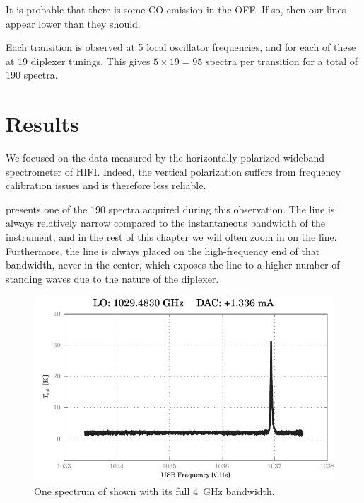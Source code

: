 It is probable that there is some CO emission in the OFF.  If so, then our lines appear lower than they should.

Each transition is observed at 5 local oscillator frequencies, and for each of these at 19 diplexer tunings.
This gives $5 \times 19 = 95$ spectra per transition for a total of 190 spectra.



\section{Results}

We focused on the data measured by the horizontally polarized wideband spectrometer of HIFI.
Indeed, the vertical polarization suffers from frequency calibration issues and is therefore less reliable.

 presents one of the 190 spectra acquired during this observation.
The  line is always relatively narrow compared to the instantaneous bandwidth of the instrument, and in the rest of this chapter we will often zoom in on the line.
Furthermore, the line is always placed on the high-frequency end of that bandwidth, never in the center, which exposes the line to a higher number of standing waves due to the nature of the diplexer. 
\begin{figure}[hbtp]
    \centering
    \includegraphics{50015d89_WBS-H-USB_00-00_full}
    \caption{
        One spectrum of  shown with its full \SI{4}{\giga\hertz} bandwidth.
    }
    \label{fig:co98_full_bandwidth}
\end{figure}

